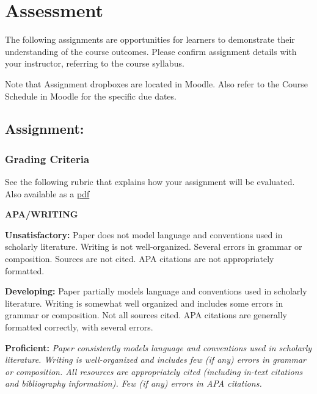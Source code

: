 \documentclass[
]{book}
\begin{document}
\hypertarget{assessment-3}{%
\chapter*{Assessment}\label{assessment-3}}

The following assignments are opportunities for learners to demonstrate their understanding of the course outcomes. Please confirm assignment details with your instructor, referring to the course syllabus.

Note that Assignment dropboxes are located in Moodle. Also refer to the Course Schedule in Moodle for the specific due dates.

\hypertarget{assignment}{%
\section*{Assignment:}\label{assignment}}

\hypertarget{grading-criteria}{%
\subsection*{Grading Criteria}\label{grading-criteria}}

See the following rubric that explains how your assignment will be evaluated. Also available as a \href{assets/assessment/Identity-as-a-Teacher-RUBRIC.pdf}{pdf}

\textbf{APA/WRITING}

\textbf{Unsatisfactory:} Paper does not model language and conventions used in scholarly literature. Writing is not well-organized. Several errors in grammar or composition. Sources are not cited. APA citations are not appropriately formatted.

\textbf{Developing:} Paper partially models language and conventions used in scholarly literature. Writing is somewhat well organized and includes some errors in grammar or composition. Not all sources cited. APA citations are generally formatted correctly, with several errors.

\textbf{Proficient:} \emph{Paper consistently models language and conventions used in scholarly literature. Writing is well-organized and includes few (if any) errors in grammar or composition. All resources are appropriately cited (including in-text citations and bibliography information). Few (if any) errors in APA citations.}
\end{document}
